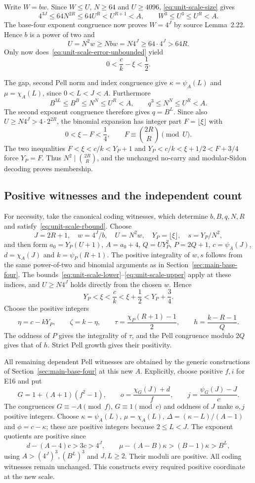 Write $W=bw$. Since $W\le U$, $N\ge64$ and $U\ge4096$,
\eqref{eq:unit-scale-size} gives
\[
 4^{3J}\le64N^{2R}\le64U^R<U^{R+1}<A,
 \qquad W^3\le U^3\le U^R<A.
\]
The base-four exponent congruence now proves $W=4^J$ by source
Lemma~2.22. Hence $b$ is a power of two and
\[
 U=N^2w\ge Nbw=N4^J\ge64\cdot4^J>64R.
\]
Only now does~\eqref{eq:unit-scale-error-unbounded} yield
\begin{equation}\label{eq:unit-scale-small-error}
 0<\frac ck-\xi<\frac12.
\end{equation}

The gap, second Pell norm and index congruence give
$\kappa=\psi_A(L)$ and $\mu=\chi_A(L)$, since
$0<L<J<A$. Furthermore
\[
 B^{3L}\le B^B\le N^N\le U^R<A,
 \qquad q^3\le N^N\le U^R<A.
\]
The second exponent congruence therefore gives $q=B^L$.
Since also $U\ge N4^J>4\cdot2^{2R}$, the binomial expansion has
integer part $F=\lfloor\xi\rfloor$ with
\[
 0<\xi-F<\frac14,\qquad
 F\equiv\binom{2R}{R}\pmod U.
\]
The two inequalities
$F<\xi<c/k<Y_P+1$ and
$Y_P<c/k<\xi+1/2<F+3/4$
force $Y_P=F$. Thus $N^2\mid\binom{2R}{R}$, and the unchanged
no-carry and modular-Sidon decoding proves membership.

\subsection{Positive witnesses and the independent count}

For necessity, take the canonical coding witnesses, which determine
$b,B,q,N,R$ and satisfy~\eqref{eq:unit-scale-rbound}. Choose
\[
 J=2R+1,\quad w=4^J/b,\quad U=N^2w,\quad
 Y_P=\lfloor\xi\rfloor,\quad s=Y_P/N^2,
\]
and then form $a_0=Y_P(U+1)$, $A=a_0+4$, $Q=UY_P^2$,
$P=2Q+1$, $c=\psi_A(J)$, $d=\chi_A(J)$ and
$k=\psi_P(R+1)$.
The positive integrality of $w,s$ follows from the same power-of-two
and binomial arguments as in Section~\ref{sec:main-base-four}.
The bounds~\eqref{eq:unit-scale-lower}--\eqref{eq:unit-scale-upper}
apply at these indices, and $U\ge N4^J$ holds directly from the
chosen $w$. Hence
\[
 Y_P<\xi<\frac ck<\xi+\frac12<Y_P+\frac34.
\]
Choose the positive integers
\[
 \eta=c-kY_P,\qquad \zeta=k-\eta,\qquad
 \tau=\frac{\chi_P(R+1)-1}{2},\qquad
 h=\frac{k-R-1}{Q}.
\]
The oddness of $P$ gives the integrality of $\tau$, and the Pell
congruence modulo $2Q$ gives that of $h$. Strict Pell growth gives
their positivity.

All remaining dependent Pell witnesses are obtained by the generic
constructions of Section~\ref{sec:main-base-four} at this new $A$.
Explicitly, choose positive $f,i$ for E16 and put
\[
 G=1+(A+1)(f^2-1),\qquad
 o=\frac{\chi_G(J)+d}{f},\qquad
 j=\frac{\psi_G(J)-J}{c}.
\]
The congruences $G\equiv-A\pmod f$, $G\equiv1\pmod c$ and oddness
of $J$ make $o,j$ positive integers. Choose
$\kappa=\psi_A(L)$, $\mu=\chi_A(L)$,
$\Delta=(\kappa-L)/(A-1)$ and $\phi=c-\kappa$; these are
positive integers because $2\le L<J$.
The exponent quotients are positive since
\[
 d-(A-4)c>3c>4^J,\qquad
 \mu-(A-B)\kappa>(B-1)\kappa>B^L,
\]
using $A>(4^J)^3,(B^L)^3$ and $J,L\ge2$.
Their moduli are positive. All coding witnesses remain unchanged.
This constructs every required positive coordinate at the new scale.


